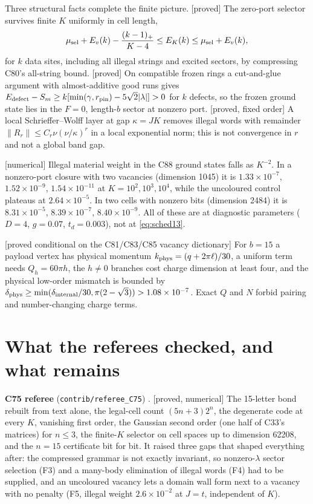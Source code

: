\documentclass[11pt]{article}
\newcommand{\tg}[1]{\textsf{[#1]}}
\newcommand{\repo}[1]{\texttt{#1}}
\begin{document}
Three structural facts complete the finite picture. \tg{proved} The zero-port selector survives finite $K$ uniformly in cell length,
\begin{align}
\mu_{\rm sel}+E_v(k)-\frac{(k-1)_+}{K-4}\le E_K(k)\le\mu_{\rm sel}+E_v(k),\label{eq:selector}
\end{align}
for $k$ data sites, including all illegal strings and excited sectors, by compressing C80's all-string bound. \tg{proved} On compatible frozen rings a cut-and-glue argument with almost-additive good runs gives $E_{\rm defect}-S_m\ge k[\min(\gamma,r_{\rm pin})-5\sqrt2|\lambda|]>0$ for $k$ defects, so the frozen ground state lies in the $F=0$, length-$b$ sector at nonzero port. \tg{proved, fixed order} A local Schrieffer--Wolff layer at gap $\kappa=JK$ removes illegal words with remainder $\|R_r\|\le C_r\nu(\nu/\kappa)^r$ in a local exponential norm; this is not convergence in $r$ and not a global band gap.

\tg{numerical} Illegal material weight in the C88 ground states falls as $K^{-2}$. In a nonzero-port closure with two vacancies (dimension 1045) it is $1.33\times10^{-7}$, $1.52\times10^{-9}$, $1.54\times10^{-11}$ at $K=10^2,10^3,10^4$, while the uncoloured control plateaus at $2.64\times10^{-5}$. In two cells with nonzero bits (dimension 2484) it is $8.31\times10^{-5}$, $8.39\times10^{-7}$, $8.40\times10^{-9}$. All of these are at diagnostic parameters ($D=4$, $g=0.07$, $t_d=0.003$), not at \eqref{eq:sched13}.

\tg{proved conditional on the C81/C83/C85 vacancy dictionary} For $b=15$ a payload vertex has physical momentum $k_{\rm phys}=(q+2\pi\ell)/30$, a uniform term needs $Q_h=60\pi h$, the $h\neq0$ branches cost charge dimension at least four, and the physical low-order mismatch is bounded by $\delta_{\rm phys}\ge\min(\delta_{\rm internal}/30,\pi(2-\sqrt3))>1.08\times10^{-7}$. Exact $Q$ and $N$ forbid pairing and number-changing charge terms.

\section{What the referees checked, and what remains}\label{sec:referees}

\textbf{C75 referee} (\repo{contrib/referee\_C75}) \cite{refC75}. \tg{proved, numerical} The 15-letter bond rebuilt from text alone, the legal-cell count $(5n+3)2^n$, the degenerate code at every $K$, vanishing first order, the Gaussian second order (one half of C33's matrices) for $n\le3$, the finite-$K$ selector on cell spaces up to dimension 62208, and the $n=15$ certificate bit for bit. It raised three gaps that shaped everything after: the compressed grammar is not exactly invariant, so nonzero-$\lambda$ sector selection (F3) and a many-body elimination of illegal words (F4) had to be supplied, and an uncoloured vacancy lets a domain wall form next to a vacancy with no penalty (F5, illegal weight $2.6\times10^{-2}$ at $J=t$, independent of $K$).
\end{document}
